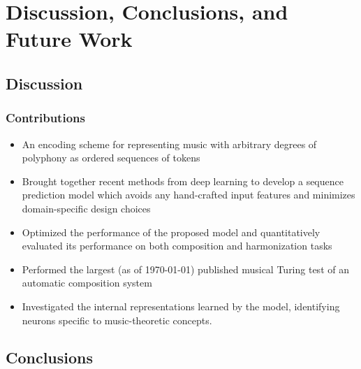 \chapter{Discussion, Conclusions, and Future Work}\label{ch:conclusion}


\ifpdf
    \graphicspath{{Chapter7/Figs/Raster/}{Chapter7/Figs/PDF/}{Chapter7/Figs/}}
\else
    \graphicspath{{Chapter7/Figs/Vector/}{Chapter7/Figs/}}
\fi

\section{Discussion}

\subsection{Contributions}

\begin{itemize}
    \item An encoding scheme for representing music with arbitrary degrees of polyphony
        as ordered sequences of tokens
    \item Brought together recent methods from deep learning to develop a
        sequence prediction model which avoids any hand-crafted input features
        and minimizes domain-specific design choices
    \item Optimized the performance of the proposed model and quantitatively
        evaluated its performance on both composition and harmonization tasks
    \item Performed the largest (as of \today) published musical Turing test of an
        automatic composition system
    \item Investigated the internal representations learned by the model, identifying
        neurons specific to music-theoretic concepts.
\end{itemize}

\section{Conclusions}

